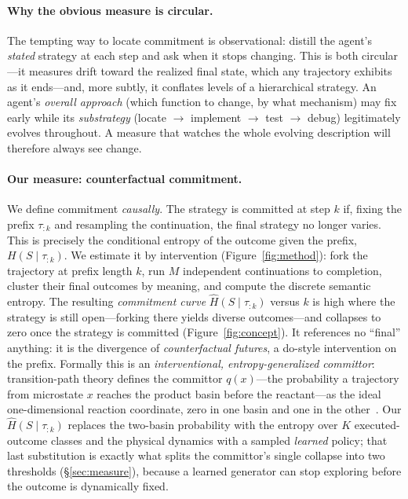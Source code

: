 \documentclass[11pt]{article}
\newcommand{\Hk}{\widehat{H}\!\left(S \mid \tau_{:k}\right)}
\newcommand{\strat}{S}
\newcommand{\prefix}{\tau_{:k}}
\begin{document}
\paragraph{Why the obvious measure is circular.}
The tempting way to locate commitment is observational: distill the agent's
\emph{stated} strategy at each step and ask when it stops changing. This is both
circular---it measures drift toward the realized final state, which any trajectory
exhibits as it ends---and, more subtly, it conflates levels of a hierarchical
strategy. An agent's \emph{overall approach} (which function to change, by what
mechanism) may fix early while its \emph{substrategy} (locate $\to$ implement
$\to$ test $\to$ debug) legitimately evolves throughout. A measure that watches
the whole evolving description will therefore always see change.

\paragraph{Our measure: counterfactual commitment.}
We define commitment \emph{causally}. The strategy is committed at step $k$ if,
fixing the prefix $\prefix$ and resampling the continuation, the final strategy no
longer varies. This is precisely the conditional entropy of the outcome given the
prefix, $H(\strat \mid \prefix)$. We estimate it by intervention
(Figure~\ref{fig:method}): fork the trajectory at prefix length $k$, run $M$
independent continuations to completion, cluster their final outcomes by meaning,
and compute the discrete semantic entropy. The resulting \emph{commitment curve}
$\Hk$ versus $k$ is high where the strategy is still open---forking there yields
diverse outcomes---and collapses to zero once the strategy is committed
(Figure~\ref{fig:concept}). It references no ``final'' anything: it is the
divergence of \emph{counterfactual futures}, a do-style intervention on the
prefix. Formally this is an \emph{interventional, entropy-generalized committor}:
transition-path theory defines the committor $q(x)$---the probability a trajectory
from microstate $x$ reaches the product basin before the reactant---as the ideal
one-dimensional reaction coordinate, zero in one basin and one in the
other~\citep{evanden2010tpt,louwerse2022infothermo}. Our $\Hk$ replaces the
two-basin probability with the entropy over $K$ executed-outcome classes and the
physical dynamics with a sampled \emph{learned} policy; that last substitution is
exactly what splits the committor's single collapse into two thresholds
(\S\ref{sec:measure}), because a learned generator can stop exploring before the
outcome is dynamically fixed.
\end{document}
